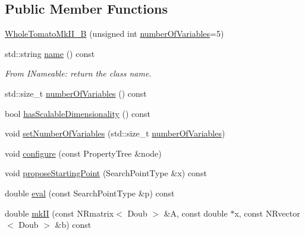 \subsection*{\-Public \-Member \-Functions}
\begin{DoxyCompactItemize}
\item 
\hyperlink{struct_p_r_p_s_evolution_1_1_models_1_1_whole_tomato_mk_i_i___b_ab4e9ac99074acbb27b9883ec75a57224}{\-Whole\-Tomato\-Mk\-I\-I\-\_\-\-B} (unsigned int \hyperlink{struct_p_r_p_s_evolution_1_1_models_1_1_whole_tomato_mk_i_i___b_a45700280dbcf64f3c52f2927cdb4e5c7}{number\-Of\-Variables}=5)
\item 
std\-::string \hyperlink{struct_p_r_p_s_evolution_1_1_models_1_1_whole_tomato_mk_i_i___b_a357491a2889fab3ecdcf8aa110770ee3}{name} () const 
\begin{DoxyCompactList}\small\item\em \-From \-I\-Nameable\-: return the class name. \end{DoxyCompactList}\item 
std\-::size\-\_\-t \hyperlink{struct_p_r_p_s_evolution_1_1_models_1_1_whole_tomato_mk_i_i___b_a45700280dbcf64f3c52f2927cdb4e5c7}{number\-Of\-Variables} () const 
\item 
bool \hyperlink{struct_p_r_p_s_evolution_1_1_models_1_1_whole_tomato_mk_i_i___b_a430e0329bc904ca54bc195757e8265e9}{has\-Scalable\-Dimensionality} () const 
\item 
void \hyperlink{struct_p_r_p_s_evolution_1_1_models_1_1_whole_tomato_mk_i_i___b_abae531644e608bfbb27e4dbaf616683d}{set\-Number\-Of\-Variables} (std\-::size\-\_\-t \hyperlink{struct_p_r_p_s_evolution_1_1_models_1_1_whole_tomato_mk_i_i___b_a45700280dbcf64f3c52f2927cdb4e5c7}{number\-Of\-Variables})
\item 
void \hyperlink{struct_p_r_p_s_evolution_1_1_models_1_1_whole_tomato_mk_i_i___b_a86d704bd43c839c6d236acd90e719c29}{configure} (const \-Property\-Tree \&node)
\item 
void \hyperlink{struct_p_r_p_s_evolution_1_1_models_1_1_whole_tomato_mk_i_i___b_a3a50fedff53e00310d19f06cc6df10c9}{propose\-Starting\-Point} (\-Search\-Point\-Type \&x) const 
\item 
double \hyperlink{struct_p_r_p_s_evolution_1_1_models_1_1_whole_tomato_mk_i_i___b_a032fa951a30bea3059f17ded3081bab6}{eval} (const \-Search\-Point\-Type \&p) const 
\item 
double \hyperlink{struct_p_r_p_s_evolution_1_1_models_1_1_whole_tomato_mk_i_i___b_a403963e33edc1a53e9e6688c207c09c4}{mk\-I\-I} (const \-N\-Rmatrix$<$ \-Doub $>$ \&\-A, const double $\ast$x, const \-N\-Rvector$<$ \-Doub $>$ \&b) const 

\end{DoxyCompactItemize}
